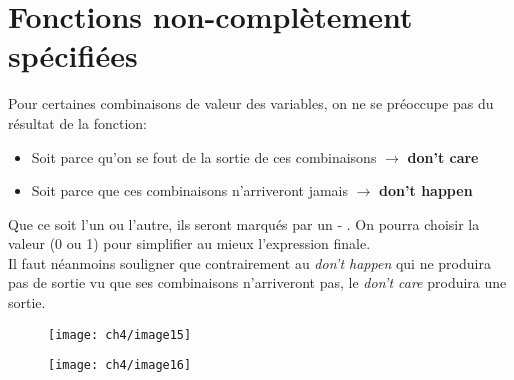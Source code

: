 \section{Fonctions non-complètement spécifiées}
Pour certaines combinaisons de valeur des variables, on ne se préoccupe pas du résultat de la fonction:
\begin{itemize}
	\item Soit parce qu'on se fout de la sortie de ces combinaisons $\rightarrow$ \textbf{don't care}
	\item Soit parce que ces combinaisons n'arriveront jamais $\rightarrow$ \textbf{don't happen}
\end{itemize}
Que ce soit l'un ou l'autre, ils seront marqués par un - . On pourra choisir la valeur (0 ou 1) pour simplifier au mieux l'expression finale.\\

Il faut néanmoins souligner que contrairement au \textit{don't happen} qui ne produira pas de sortie vu que ses combinaisons n'arriveront pas, le \textit{don't care} produira une sortie.

\begin{figure}[H]
	\begin{minipage}{0.5\textwidth}
		\centering
		\texttt{[image: ch4/image15]}
	\end{minipage}
	\begin{minipage}{0.5\textwidth}
		\centering
		\texttt{[image: ch4/image16]}
	\end{minipage}
\end{figure}